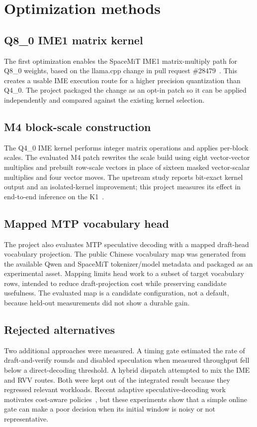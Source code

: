 \documentclass[10pt,twocolumn]{article}
\begin{document}
\section{Optimization methods}
\label{sec:methods}
\subsection{Q8\_0 IME1 matrix kernel}
The first optimization enables the SpaceMiT IME1 matrix-multiply path for Q8\_0 weights, based on the llama.cpp change in pull request \#28479~\cite{llamacpp_q8_ime}. This creates a usable IME execution route for a higher precision quantization than Q4\_0. The project packaged the change as an opt-in patch so it can be applied independently and compared against the existing kernel selection.

\subsection{M4 block-scale construction}
The Q4\_0 IME kernel performs integer matrix operations and applies per-block scales. The evaluated M4 patch rewrites the scale build using eight vector-vector multiplies and prebuilt row-scale vectors in place of sixteen masked vector-scalar multiplies and four vector moves. The upstream study reports bit-exact kernel output and an isolated-kernel improvement; this project measures its effect in end-to-end inference on the K1~\cite{x60_scale_study}.

\subsection{Mapped MTP vocabulary head}
The project also evaluates MTP speculative decoding with a mapped draft-head vocabulary projection. The public Chinese vocabulary map was generated from the available Qwen and SpaceMiT tokenizer/model metadata and packaged as an experimental asset. Mapping limits head work to a subset of target vocabulary rows, intended to reduce draft-projection cost while preserving candidate usefulness. The evaluated map is a candidate configuration, not a default, because held-out measurements did not show a durable gain.

\subsection{Rejected alternatives}
Two additional approaches were measured. A timing gate estimated the rate of draft-and-verify rounds and disabled speculation when measured throughput fell below a direct-decoding threshold. A hybrid dispatch attempted to mix the IME and RVV routes. Both were kept out of the integrated result because they regressed relevant workloads. Recent adaptive speculative-decoding work motivates cost-aware policies~\cite{learning_to_draft,adasd}, but these experiments show that a simple online gate can make a poor decision when its initial window is noisy or not representative.
\end{document}
